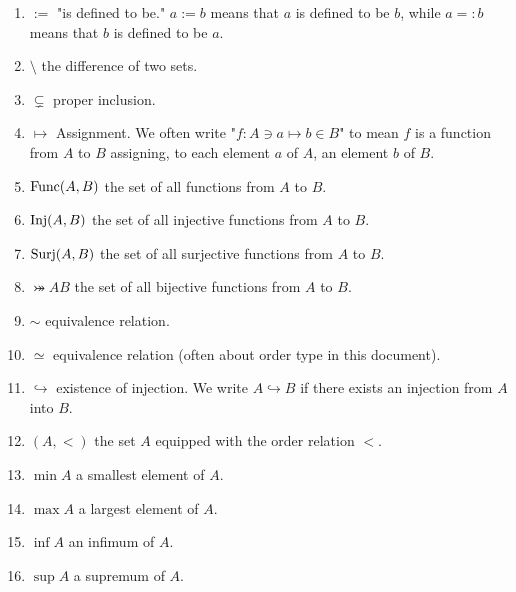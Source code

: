 \documentclass[a4paper,12pt]{article}
\begin{document}
\begin{enumerate}
	\item
	      \( := \)\COLON
	      "is defined to be."
	      \( a:=b \) means that \( a\) is defined to be \( b \), while 
	      \( a=:b \) means that \( b\) is defined to be \( a \).
	      
	\item
	      \( \setminus \)\COLON
	      the difference of two sets.
	      
	\item
	      \( \subsetneq \)\COLON
	      proper inclusion.
	      
	\item
	      \( \mapsto \)\COLON
	      Assignment.
	      We often write
	      "\( f:A \ni a \mapsto b \in B\)"
	      to mean \( f \) is a function from \( A \) to \( B \)
	      assigning, to each element \( a \) of \( A \), an element \( b \) of \( B \).
	      
	\item
	      \( \mathrm{Func}(A,B) \)\COLON
	      the set of all functions from \( A \) to \( B \).
	      
	\item
	      \( \mathrm{Inj}(A,B) \)\COLON
	      the set of all injective functions from \( A \) to \( B \).
	      
	\item
	      \( \mathrm{Surj}(A,B) \)\COLON
	      the set of all surjective functions from \( A \) to \( B \).
	      
	\item
	      \( \bij{A}{B} \)\COLON
	      the set of all bijective functions from \( A \) to \( B \).
	      
	\item
	      \( \sim \)\COLON
	      equivalence relation.
	      
	\item
	      \( \simeq \)\COLON
	      equivalence relation (often about order type in this document).
	      
	\item
	      \( \hookrightarrow \)\COLON
	      existence of injection.
	      We write \( A \hookrightarrow B\) if there exists an injection from \( A \) into \( B \).
	      
	\item
	      \( (A,<) \)\COLON
	      the set \( A \) equipped with the order relation \( < \).
	      
	\item
	      \( \min{A} \)\COLON
	      a smallest element of \( A \).
	      
	\item
	      \( \max{A} \)\COLON
	      a largest element of \( A \).
	      
	\item
	      \( \inf{A} \)\COLON
	      an infimum of \( A \).
	      
	\item
	      \( \sup{A} \)\COLON
	      a supremum of \( A \).
	      
	      
	      
\end{enumerate}
\end{document}
